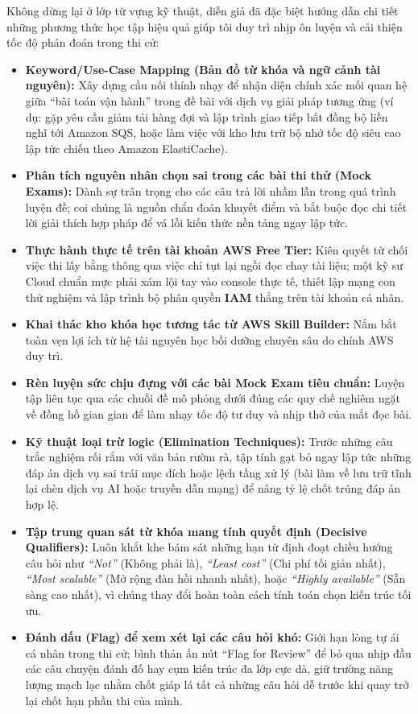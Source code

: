 Không dừng lại ở lớp từ vựng kỹ thuật, diễn giả đã đặc biệt hướng dẫn
chi tiết những phương thức học tập hiệu quả giúp tôi duy trì nhịp ôn
luyện và cải thiện tốc độ phán đoán trong thi cử:

\begin{itemize}
\tightlist
\item
  \textbf{Keyword/Use-Case Mapping (Bản đồ từ khóa và ngữ cảnh tài
  nguyên):} Xây dựng cầu nối thính nhạy để nhận diện chính xác mối quan
  hệ giữa ``bài toán vận hành'' trong đề bài với dịch vụ giải pháp tương
  ứng (ví dụ: gặp yêu cầu giảm tải hàng đợi và lập trình giao tiếp bất
  đồng bộ liền nghĩ tới Amazon SQS, hoặc làm việc với kho lưu trữ bộ nhớ
  tốc độ siêu cao lập tức chiếu theo Amazon ElastiCache).
\item
  \textbf{Phân tích nguyên nhân chọn sai trong các bài thi thử (Mock
  Exams):} Dành sự trân trọng cho các câu trả lời nhầm lẫn trong quá
  trình luyện đề; coi chúng là nguồn chẩn đoán khuyết điểm và bắt buộc
  đọc chi tiết lời giải thích hợp pháp để vá lỗi kiến thức nền tảng ngay
  lập tức.
\item
  \textbf{Thực hành thực tế trên tài khoản AWS Free Tier:} Kiên quyết từ
  chối việc thi lấy bằng thông qua việc chỉ tụt lại ngồi đọc chay tài
  liệu; một kỹ sư Cloud chuẩn mực phải xám lội tay vào console thực tế,
  thiết lập mạng con thử nghiệm và lập trình bộ phân quyền \textbf{IAM}
  thẳng trên tài khoản cá nhân.
\item
  \textbf{Khai thác kho khóa học tương tác từ AWS Skill Builder:} Nắm
  bắt toàn vẹn lợi ích từ hệ tài nguyên học bồi dưỡng chuyên sâu do
  chính AWS duy trì.
\item
  \textbf{Rèn luyện sức chịu đựng với các bài Mock Exam tiêu chuẩn:}
  Luyện tập liên tục qua các chuỗi đề mô phỏng dưới đúng các quy chế
  nghiêm ngặt về đồng hồ gian gian để làm nhạy tốc độ tư duy và nhịp thở
  của mắt đọc bài.
\item
  \textbf{Kỹ thuật loại trừ logic (Elimination Techniques):} Trước những
  câu trắc nghiệm rối rắm với văn bản rườm rà, tập tính gạt bỏ ngay lập
  tức những đáp án dịch vụ sai trái mục đích hoặc lệch tầng xử lý (bài
  làm về lưu trữ tĩnh lại chèn dịch vụ AI hoặc truyền dẫn mạng) để nâng
  tỷ lệ chốt trúng đáp án hợp lệ.
\item
  \textbf{Tập trung quan sát từ khóa mang tính quyết định (Decisive
  Qualifiers):} Luôn khắt khe bám sát những hạn từ định đoạt chiều hướng
  câu hỏi như \emph{``Not''} (Không phải là), \emph{``Least cost''} (Chi
  phí tối giản nhất), \emph{``Most scalable''} (Mở rộng đàn hồi nhanh
  nhất), hoặc \emph{``Highly available''} (Sẵn sàng cao nhất), vì chúng
  thay đổi hoàn toàn cách tính toán chọn kiến trúc tối ưu.
\item
  \textbf{Đánh dấu (Flag) để xem xét lại các câu hỏi khó:} Giới hạn lòng
  tự ái cá nhân trong thi cử; bình thản ấn nút ``Flag for Review'' để bỏ
  qua nhịp đầu các câu chuyện đánh đố hay cụm kiến trúc đa lớp cực dà,
  giữ trường năng lượng mạch lạc nhằm chốt giáp lá tất cả những câu hỏi
  dễ trước khi quay trở lại chốt hạn phần thi của mình.
\end{itemize}

